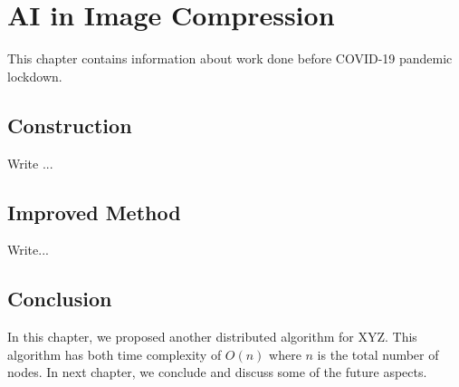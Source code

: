 \chapter{AI in Image Compression}
\label{ch:ai-image-compression}

This chapter contains information about work done before COVID-19 pandemic lockdown.

\section{Construction}

Write ...

\section{Improved Method}

Write...

\section{Conclusion}
In this chapter, we proposed another distributed algorithm for
XYZ. This algorithm has both time complexity of $O(n)$ where $n$
is the total number of nodes.  In next chapter, we conclude and
discuss some of the future aspects.